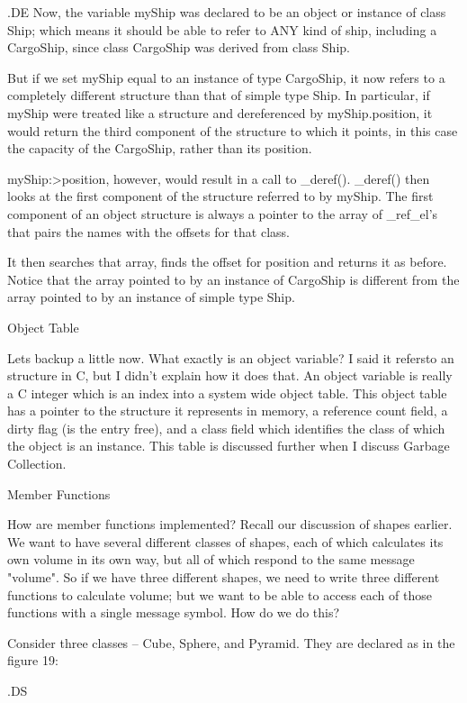 .DE
Now, the variable myShip was declared to be an object or instance of
class Ship; which means it should be able to refer to ANY kind of ship,
including a CargoShip, since class CargoShip was derived from class Ship.

But if we set myShip equal to an instance of type CargoShip, it now
refers to a completely different structure than that of simple type Ship.
In particular, if myShip were treated like a structure and dereferenced
by myShip.position, it would return the third component of the structure
to which it points, in this case the capacity of the CargoShip, rather
than its position.

myShip:>position, however, would result in a call to _deref().  _deref()
then looks at the first component of the structure referred to by myShip.
The first component of an object structure is always a pointer to the
array of _ref_el's that pairs the names with the offsets for that class.

It then searches that array, finds the offset for position and returns it
as before.  Notice that the array pointed to by an instance of CargoShip is
different from the array pointed to by an instance of simple type Ship.


Object Table

Lets backup a little now.  What exactly is an object variable?  I said
it \fI refers\fP to an structure in C, but I didn't explain how it
does that.  An object variable is really a C integer which is an index into
a system wide object table.  This object table has a pointer to the 
structure it represents in memory, a reference count field, a dirty flag
(is the entry free), and a class field which identifies the class of which
the object is an instance.  This table is discussed further when I
discuss Garbage Collection.

Member Functions

How are member functions implemented?  Recall our discussion of shapes
earlier.  We want to have several different classes of shapes, each of which
calculates its own volume in its own way, but all of which respond to
the same message "volume".  So if we have three different shapes, we
need to write three different functions to calculate volume; but we
want to be able to access each of those functions with a single message
symbol.  How do we do this?

Consider three classes -- Cube, Sphere, and Pyramid.  They are declared
as in the figure 19:

.DS

